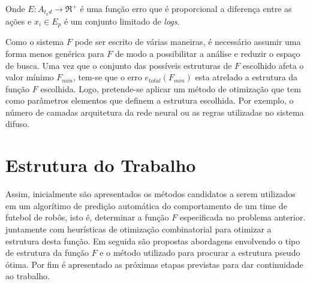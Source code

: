 Onde $E: A_{t_ad} \rightarrow \Re^+$ é uma função erro que é proporcional a diferença entre as ações e
${x_i} \in E_p$ é um conjunto limitado de \textit{logs}.

Como o sistema $F$ pode ser escrito de várias maneiras, é necessário assumir uma forma menos genérica
para $F$ de modo a possibilitar a análise e reduzir o espaço de busca. Uma vez que o conjunto das possíveis estruturas de $F$
escolhido afeta o valor mínimo $F_{min}$, tem-se que o erro $e_{total}(F_{min})$ esta atrelado a estrutura da função
$F$ escolhida. Logo, pretende-se aplicar um método de otimização que tem como parâmetros elementos que definem a estrutura
escolhida. Por exemplo, o número de camadas arquitetura da rede neural ou as regras utilizadas no sistema difuso.

\section{Estrutura do Trabalho}

\par Assim, inicialmente são apresentados os métodos candidatos a serem utilizados em um algorítimo de predição
automática do comportamento de um time de futebol de robôs, isto é, determinar a função $F$ especificada no problema anterior.
juntamente com heurísticas de otimização combinatorial para otimizar a estrutura desta função. Em seguida são propostas 
abordagens envolvendo o tipo de estrutura da função $F$ e o método utilizado para procurar a estrutura pseudo ótima. Por fim é 
apresentado as próximas etapas previstas para dar continuidade ao trabalho.
